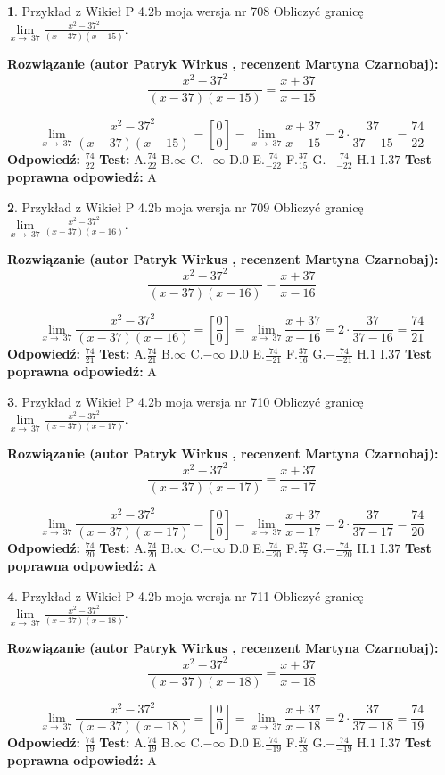 \documentclass[12pt, a4paper]{article}
\theoremstyle{definition} %
\newtheorem{zad}{}
\newcommand{\zadStart}[1]{\begin{zad}#1\newline}
\newcommand{\zadStop}{\end{zad}}
\newcommand{\rozwStart}[2]{\noindent \textbf{Rozwiązanie (autor #1 , recenzent #2): }\newline}
\newcommand{\rozwStop}{\newline}
\newcommand{\odpStart}{\noindent \textbf{Odpowiedź:}\newline}
\newcommand{\odpStop}{\newline}
\newcommand{\testStart}{\noindent \textbf{Test:}\newline}
\newcommand{\testStop}{\newline}
\newcommand{\kluczStart}{\noindent \textbf{Test poprawna odpowiedź:}\newline}
\newcommand{\kluczStop}{\newline}
\begin{document}
\zadStart{Przykład z Wikieł P 4.2b moja wersja nr 708}
Obliczyć granicę $\lim\limits_{x\to\ 37}\frac{x^{2}-37^{2}}{(x-37)(x-15)}$.
\zadStop
\rozwStart{Patryk Wirkus}{Martyna Czarnobaj}
$$\frac{x^{2}-37^{2}}{(x-37)(x-15)}=\frac{x+37}{x-15}$$

$$\lim\limits_{x\to\ 37}\frac{x^{2}-37^{2}}{(x-37)(x-15)}=[\frac{0}{0}]=\lim\limits_{x\to\ 37}\frac{x+37}{x-15}=2 \cdot \frac{37}{37-15} = \frac{74}{22}$$
\rozwStop
\odpStart
$\frac{74}{22}$
\odpStop
\testStart
A.$\frac{74}{22}$
B.$\infty$
C.$-\infty$
D.$0$
E.$\frac{74}{-22}$
F.$\frac{37}{15}$
G.$-\frac{74}{-22}$
H.$1$
I.$37$
\testStop
\kluczStart
A
\kluczStop



\zadStart{Przykład z Wikieł P 4.2b moja wersja nr 709}
Obliczyć granicę $\lim\limits_{x\to\ 37}\frac{x^{2}-37^{2}}{(x-37)(x-16)}$.
\zadStop
\rozwStart{Patryk Wirkus}{Martyna Czarnobaj}
$$\frac{x^{2}-37^{2}}{(x-37)(x-16)}=\frac{x+37}{x-16}$$

$$\lim\limits_{x\to\ 37}\frac{x^{2}-37^{2}}{(x-37)(x-16)}=[\frac{0}{0}]=\lim\limits_{x\to\ 37}\frac{x+37}{x-16}=2 \cdot \frac{37}{37-16} = \frac{74}{21}$$
\rozwStop
\odpStart
$\frac{74}{21}$
\odpStop
\testStart
A.$\frac{74}{21}$
B.$\infty$
C.$-\infty$
D.$0$
E.$\frac{74}{-21}$
F.$\frac{37}{16}$
G.$-\frac{74}{-21}$
H.$1$
I.$37$
\testStop
\kluczStart
A
\kluczStop



\zadStart{Przykład z Wikieł P 4.2b moja wersja nr 710}
Obliczyć granicę $\lim\limits_{x\to\ 37}\frac{x^{2}-37^{2}}{(x-37)(x-17)}$.
\zadStop
\rozwStart{Patryk Wirkus}{Martyna Czarnobaj}
$$\frac{x^{2}-37^{2}}{(x-37)(x-17)}=\frac{x+37}{x-17}$$

$$\lim\limits_{x\to\ 37}\frac{x^{2}-37^{2}}{(x-37)(x-17)}=[\frac{0}{0}]=\lim\limits_{x\to\ 37}\frac{x+37}{x-17}=2 \cdot \frac{37}{37-17} = \frac{74}{20}$$
\rozwStop
\odpStart
$\frac{74}{20}$
\odpStop
\testStart
A.$\frac{74}{20}$
B.$\infty$
C.$-\infty$
D.$0$
E.$\frac{74}{-20}$
F.$\frac{37}{17}$
G.$-\frac{74}{-20}$
H.$1$
I.$37$
\testStop
\kluczStart
A
\kluczStop



\zadStart{Przykład z Wikieł P 4.2b moja wersja nr 711}
Obliczyć granicę $\lim\limits_{x\to\ 37}\frac{x^{2}-37^{2}}{(x-37)(x-18)}$.
\zadStop
\rozwStart{Patryk Wirkus}{Martyna Czarnobaj}
$$\frac{x^{2}-37^{2}}{(x-37)(x-18)}=\frac{x+37}{x-18}$$

$$\lim\limits_{x\to\ 37}\frac{x^{2}-37^{2}}{(x-37)(x-18)}=[\frac{0}{0}]=\lim\limits_{x\to\ 37}\frac{x+37}{x-18}=2 \cdot \frac{37}{37-18} = \frac{74}{19}$$
\rozwStop
\odpStart
$\frac{74}{19}$
\odpStop
\testStart
A.$\frac{74}{19}$
B.$\infty$
C.$-\infty$
D.$0$
E.$\frac{74}{-19}$
F.$\frac{37}{18}$
G.$-\frac{74}{-19}$
H.$1$
I.$37$
\testStop
\kluczStart
A
\kluczStop
\end{document}

